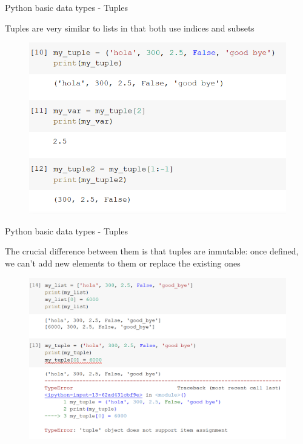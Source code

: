 \documentclass[aspectratio=169]{beamer}
\begin{document}
\begin{frame}{Python basic data types - Tuples}

	Tuples are very similar to lists in that both use indices and subsets

	\begin{figure}
		\centering
		\includegraphics[width=0.55\linewidth]{img/tuple_index_subset.png}
	\end{figure}

\end{frame}

\begin{frame}{Python basic data types - Tuples}


	The crucial difference between them is that tuples are inmutable: once defined, we can't add new elements to them or replace the existing ones

	\begin{figure}
		\centering
		\includegraphics[width=0.55\linewidth]{img/tuple_error.png}
	\end{figure}

\end{frame}
\end{document}
